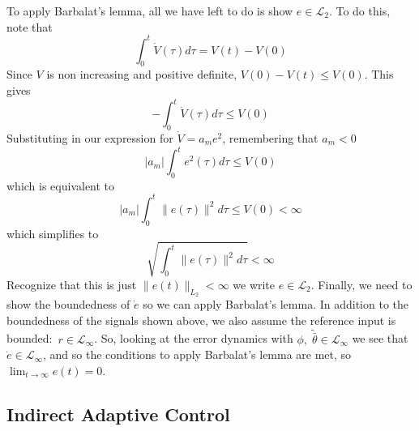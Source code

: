 To apply Barbalat's lemma, all we have left to do is show $e\in\mathcal{L}_{2}$.
To do this, note that
\begin{equation*}
  \int_{0}^{t}\dot{V}(\tau)d\tau=V(t)-V(0)
\end{equation*}
Since $V$ is non increasing and positive definite, $V(0)-V(t)\leq V(0)$.
This gives
\begin{equation*}
  -\int_{0}^{t}\dot{V}(\tau)d\tau\leq V(0)
\end{equation*}
Substituting in our expression for $\dot{V}=a_{m}e^{2}$, remembering that $a_{m}<0$
\begin{equation*}
  |a_{m}|\int_{0}^{t}e^{2}(\tau)d\tau\leq V(0)
\end{equation*}
which is equivalent to
\begin{equation*}
  |a_{m}|\int_{0}^{t}\|e(\tau)\|^{2}d\tau\leq V(0)<\infty
\end{equation*}
which simplifies to
\begin{equation*}
  \sqrt{\int_{0}^{t}\|e(\tau)\|^{2}d\tau}<\infty
\end{equation*}
Recognize that this is just $\|e(t)\|_{L_{2}}<\infty$ we write $e\in\mathcal{L}_{2}$.
Finally, we need to show the boundedness of $\dot{e}$ so we can apply Barbalat's lemma.
In addition to the boundedness of the signals shown above, we also assume the reference input is bounded:\ $r\in\mathcal{L}_{\infty}$.
So, looking at the error dynamics with $\phi,\;\tilde{\bar{\theta}}\in\mathcal{L}_{\infty}$ we see that $\dot{e}\in\mathcal{L}_{\infty}$, and so the conditions to apply Barbalat's lemma are met, so $\lim_{t\rightarrow\infty}e(t)=0$.

\subsection{Indirect Adaptive Control}

